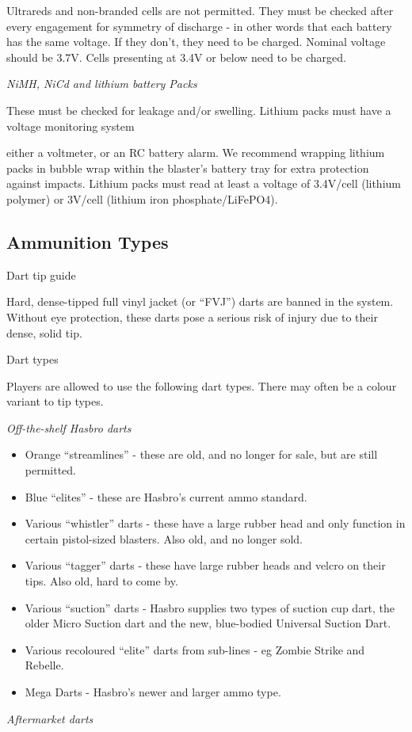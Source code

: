 \documentclass{scrbook}
\begin{document}
Ultrareds and non-branded cells are not permitted. They must be checked after every engagement for symmetry of discharge - in other words that each battery has the same voltage. If they don't, they need to be charged. Nominal voltage should be 3.7V. Cells presenting at 3.4V or below need to be charged.

\textit{NiMH, NiCd and lithium battery Packs}

These must be checked for leakage and/or swelling. Lithium packs must have a voltage monitoring system

either a voltmeter, or an RC battery alarm. We recommend wrapping lithium packs in bubble wrap within the blaster's battery tray for extra protection against impacts. Lithium packs must read at least a voltage of 3.4V/cell (lithium polymer) or 3V/cell (lithium iron phosphate/LiFePO4).

\subsection{Ammunition Types}

Dart tip guide

Hard, dense-tipped full vinyl jacket (or ``FVJ'') darts are banned in the system. Without eye protection, these darts pose a serious risk of injury due to their dense, solid tip.

Dart types

Players are allowed to use the following dart types. There may often be a colour variant to tip types.

\textit{Off-the-shelf Hasbro darts}

\begin{itemize}
\item Orange ``streamlines'' - these are old, and no longer for sale, but are still permitted.

\item Blue ``elites'' - these are Hasbro's current ammo standard.

\item Various ``whistler'' darts - these have a large rubber head and only function in certain pistol-sized blasters. Also old, and no longer sold.

\item Various ``tagger'' darts - these have large rubber heads and velcro on their tips. Also old, hard to come by.

\item Various ``suction'' darts - Hasbro supplies two types of suction cup dart, the older Micro Suction dart and the new, blue-bodied Universal Suction Dart.

\item Various recoloured ``elite'' darts from sub-lines - eg Zombie Strike and Rebelle.

\item Mega Darts - Hasbro's newer and larger ammo type.

\end{itemize}
\textit{Aftermarket darts}
\end{document}
